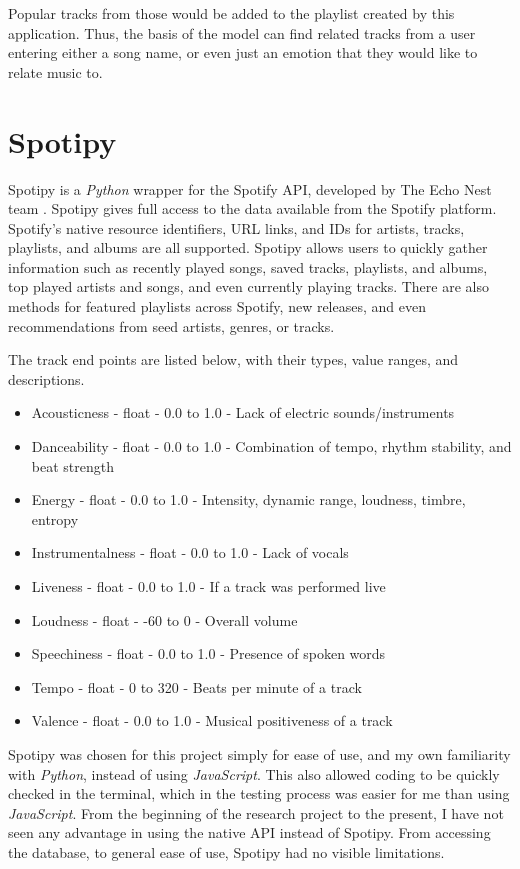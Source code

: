 Popular tracks from those would be added to the playlist created by this application.
Thus, the basis of the model can find related tracks from a user entering either a
song name, or even just an emotion that they would like to relate music to.

\section{Spotipy}

Spotipy is a \textit{Python} wrapper for the Spotify API, developed by The Echo Nest
team \cite{Lamere:17}. Spotipy gives full access to the data available from the
Spotify platform. Spotify's native resource identifiers, URL links, and IDs for
artists, tracks, playlists, and albums are all supported. Spotipy allows users to
quickly gather information such as recently played songs, saved tracks, playlists,
and albums, top played artists and songs, and even currently playing tracks.
There are also methods for featured playlists across Spotify, new releases, and
even recommendations from seed artists, genres, or tracks.

The track end points are listed below, with their types, value ranges, and descriptions.
\begin{itemize}
  \item Acousticness - float - 0.0 to 1.0 - Lack of electric sounds/instruments
  \item Danceability - float - 0.0 to 1.0 - Combination of tempo, rhythm stability,
  and beat strength
  \item Energy - float - 0.0 to 1.0 - Intensity, dynamic range, loudness, timbre, entropy
  \item Instrumentalness - float - 0.0 to 1.0 - Lack of vocals
  \item Liveness - float - 0.0 to 1.0 - If a track was performed live
  \item Loudness - float - -60 to 0 - Overall volume
  \item Speechiness - float - 0.0 to 1.0 - Presence of spoken words
  \item Tempo - float - 0 to 320 - Beats per minute of a track
  \item Valence - float - 0.0 to 1.0 - Musical positiveness of a track
\end{itemize}

Spotipy was chosen for this project simply for ease of use, and my own familiarity
with \textit{Python}, instead of using \textit{JavaScript}. This also allowed
coding to be quickly checked in the terminal, which in the testing process
was easier for me than using \textit{JavaScript}. From the beginning of the
research project to the present, I have not seen any advantage in using the native
API instead of Spotipy. From accessing the database, to general ease of use, Spotipy
had no visible limitations.


